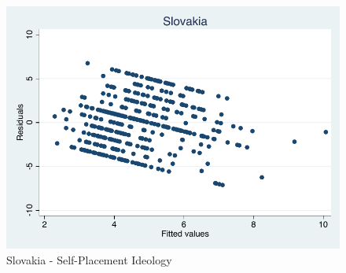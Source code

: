 \documentclass[12pt, titlepage]{article}
\begin{document}
\begin{figure}[H]
	\centering 
	\includegraphics[width=\textwidth]{Residuals/CountryIdeo/Slovakia}
	\caption{Slovakia - Self-Placement Ideology}
	\label{Slovakia}
\end{figure}
\end{document}

